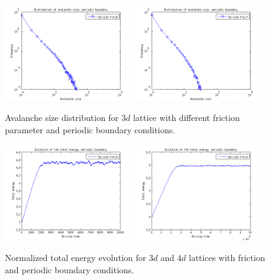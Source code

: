 \begin{figure} 
\begin{center}
\includegraphics[width=0.49\textwidth]{results/3spf08.png}
\includegraphics[width=0.49\textwidth]{results/3spf07.png} 
\caption{Avalanche size distribution for $3d$ lattice with different friction parameter and periodic boundary conditions. }
\label{3spf}
\end{center}
\end{figure}  

\begin{figure} 
\begin{center}
\includegraphics[width=0.49\textwidth]{results/3ep.png}
\includegraphics[width=0.49\textwidth]{results/4ep.png} 
\caption{Normalized total energy evolution for $3d$ and $4d$ lattices with friction and periodic boundary conditions. }
\label{ep}
\end{center}
\end{figure}  




